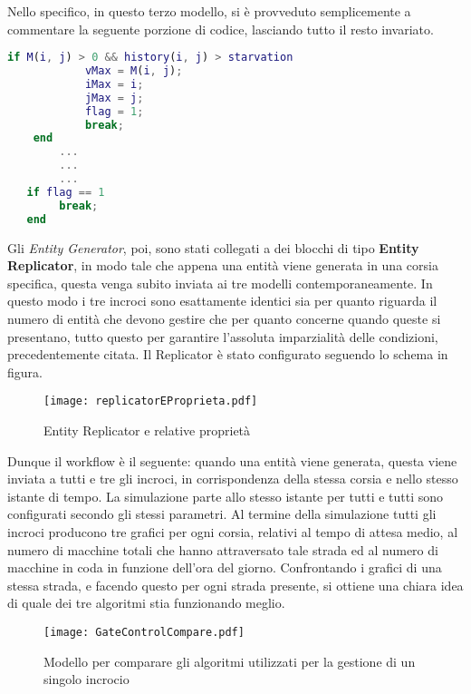 Nello specifico, in questo terzo modello, si è provveduto semplicemente a commentare la seguente porzione di codice, lasciando tutto il resto invariato.
\newline
\begin{lstlisting}[language=Matlab,label=starvation,caption= Porzione di codice relativa alla gestione della starvation]
    if M(i, j) > 0 && history(i, j) > starvation
            vMax = M(i, j);
            iMax = i;
            jMax = j;
            flag = 1;
            break;
    end
        ...
        ...
        ...
   if flag == 1
        break;
   end
\end{lstlisting}

Gli \textit{Entity Generator}, poi, sono stati collegati a dei blocchi di tipo \textbf{Entity Replicator\cite{entityreplicator}}, in modo tale che appena una entità viene generata in una corsia specifica, questa venga subito inviata ai tre modelli contemporaneamente. In questo modo i tre incroci sono esattamente identici sia per quanto riguarda il numero di entità che devono gestire che per quanto concerne quando queste si presentano, tutto questo per garantire l'assoluta imparzialità delle condizioni, precedentemente citata. Il Replicator è stato configurato seguendo lo schema in figura.
\newline

\begin{figure}[H]
\centering
  \texttt{[image: replicatorEProprieta.pdf]}
  \caption{Entity Replicator e relative proprietà}
  \label{fig:}
\end{figure}

Dunque il workflow è il seguente: quando una entità viene generata, questa viene inviata a tutti e tre gli incroci, in corrispondenza della stessa corsia e nello stesso istante di tempo. La simulazione parte allo stesso istante per tutti e tutti sono configurati secondo gli stessi parametri. Al termine della simulazione tutti gli incroci producono tre grafici per ogni corsia, relativi al tempo di attesa medio, al numero di macchine totali che hanno attraversato tale strada ed al numero di macchine in coda in funzione dell'ora del giorno. Confrontando i grafici di una stessa strada, e facendo questo per ogni strada presente, si ottiene una chiara idea di quale dei tre algoritmi stia funzionando meglio.

\newpage

\begin{figure}[H]
  \texttt{[image: GateControlCompare.pdf]}
  \caption{Modello per comparare gli algoritmi utilizzati per la gestione di un singolo incrocio}
  \label{fig:gatecontrolcompare}
\end{figure}

